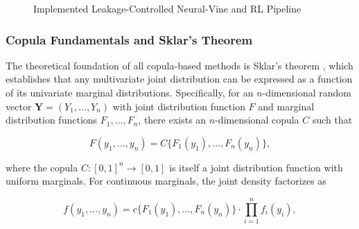 \begin{figure}[H]
\centering
{}
\caption{Implemented Leakage-Controlled Neural-Vine and RL Pipeline}
\label{fig:vine_pipeline}
\end{figure}


\subsubsection{Copula Fundamentals and Sklar's Theorem}
\label{subsubsec:3_copula_fundamentals}

The theoretical foundation of all copula-based methods is Sklar's theorem \cite{sklar_fonctions_1959}, which establishes that any multivariate joint distribution can be expressed as a function of its univariate marginal distributions. Specifically, for an \( n \)-dimensional random vector \( \boldsymbol{Y} = (Y_1, \dots, Y_n) \) with joint distribution function \( F \) and marginal distribution functions \( F_1, \dots, F_n \), there exists an \( n \)-dimensional copula \( C \) such that

\begin{equation}
F(y_1, \dots, y_n) = C\{F_1(y_1), \dots, F_n(y_n)\},
\label{eq:sklar_joint}
\end{equation}

where the copula \( C: [0,1]^n \to [0,1] \) is itself a joint distribution function with uniform marginals. For continuous marginals, the joint density factorizes as

\begin{equation}
f(y_1, \dots, y_n) = c\{F_1(y_1), \dots, F_n(y_n)\} \cdot \prod_{i=1}^n f_i(y_i),
\label{eq:joint_density}
\end{equation}

